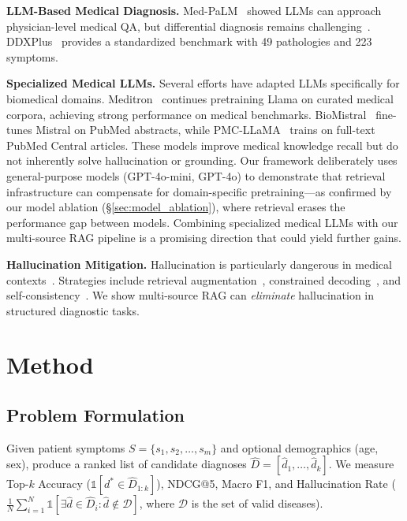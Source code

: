 \documentclass[runningheads]{llncs}
\begin{document}
\textbf{LLM-Based Medical Diagnosis.} Med-PaLM~\cite{singhal2023large} showed LLMs can approach physician-level medical QA, but differential diagnosis remains challenging~\cite{mcduff2023towards}. DDXPlus~\cite{fansi2022ddxplus} provides a standardized benchmark with 49 pathologies and 223 symptoms.

\textbf{Specialized Medical LLMs.} Several efforts have adapted LLMs specifically for biomedical domains. Meditron~\cite{chen2023meditron} continues pretraining Llama on curated medical corpora, achieving strong performance on medical benchmarks. BioMistral~\cite{labrak2024biomistral} fine-tunes Mistral on PubMed abstracts, while PMC-LLaMA~\cite{wu2024pmcllama} trains on full-text PubMed Central articles. These models improve medical knowledge recall but do not inherently solve hallucination or grounding. Our framework deliberately uses general-purpose models (GPT-4o-mini, GPT-4o) to demonstrate that retrieval infrastructure can compensate for domain-specific pretraining---as confirmed by our model ablation (\S\ref{sec:model_ablation}), where retrieval erases the performance gap between models. Combining specialized medical LLMs with our multi-source RAG pipeline is a promising direction that could yield further gains.

\textbf{Hallucination Mitigation.} Hallucination is particularly dangerous in medical contexts~\cite{ji2023survey,umapathi2023med}. Strategies include retrieval augmentation~\cite{shuster2021retrieval}, constrained decoding~\cite{lu2022neurologic}, and self-consistency~\cite{manakul2023selfcheckgpt}. We show multi-source RAG can \emph{eliminate} hallucination in structured diagnostic tasks.

\section{Method}
\label{sec:method}

\subsection{Problem Formulation}

Given patient symptoms $S = \{s_1, s_2, \ldots, s_m\}$ and optional demographics (age, sex), produce a ranked list of candidate diagnoses $\hat{D} = [\hat{d}_1, \ldots, \hat{d}_k]$. We measure Top-$k$ Accuracy ($\mathbb{1}[d^* \in \hat{D}_{1:k}]$), NDCG@5, Macro F1, and Hallucination Rate ($\frac{1}{N}\sum_{i=1}^{N} \mathbb{1}[\exists \hat{d} \in \hat{D}_i : \hat{d} \notin \mathcal{D}]$, where $\mathcal{D}$ is the set of valid diseases).
\end{document}
